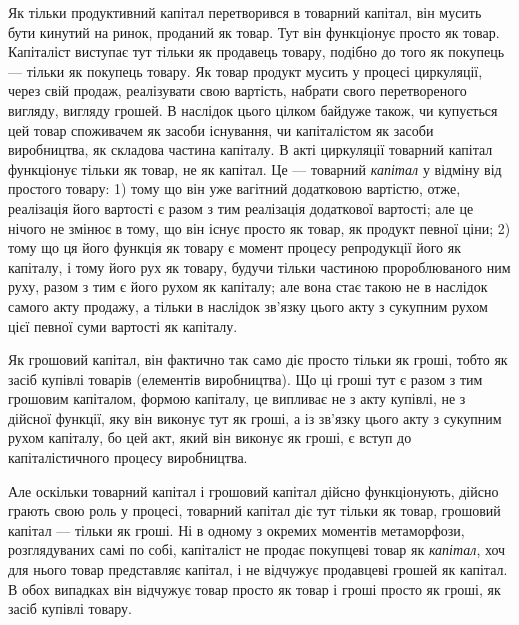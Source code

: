 Як тільки продуктивний капітал перетворився в товарний капітал,
він мусить бути кинутий на ринок, проданий як товар.
Тут він функціонує просто як товар. Капіталіст виступає тут
тільки як продавець товару, подібно до того як покупець —
тільки як покупець товару. Як товар продукт мусить у процесі
циркуляції, через свій продаж, реалізувати свою вартість, набрати
свого перетвореного вигляду, вигляду грошей. В наслідок
цього цілком байдуже також, чи купується цей товар споживачем
як засоби існування, чи капіталістом як засоби виробництва,
як складова частина капіталу. В акті циркуляції товарний
капітал функціонує тільки як товар, не як капітал. Це — товарний \emph{капітал} у відміну від простого
товару: 1) тому що він
уже вагітний додатковою вартістю, отже, реалізація його вартості
є разом з тим реалізація додаткової вартості; але це нічого не
змінює в тому, що він існує просто як товар, як продукт певної
ціни; 2) тому що ця його функція як товару є момент процесу
репродукції його як капіталу, і тому його рух як товару,
будучи тільки частиною пророблюваного ним руху, разом з тим
є його рухом як капіталу; але вона стає такою не в наслідок
самого акту продажу, а тільки в наслідок зв’язку цього акту
з сукупним рухом цієї певної суми вартості як капіталу.

Як грошовий капітал, він фактично так само діє просто тільки
як гроші, тобто як засіб купівлі товарів (елементів виробництва).
Що ці гроші тут є разом з тим грошовим капіталом, формою капіталу,
це випливає не з акту купівлі, не з дійсної функції, яку
він виконує тут як гроші, а із зв’язку цього акту з сукупним
рухом капіталу, бо цей акт, який він виконує як гроші, є вступ
до капіталістичного процесу виробництва.

Але оскільки товарний капітал і грошовий капітал дійсно
функціонують, дійсно грають свою роль у процесі, товарний капітал
діє тут тільки як товар, грошовий капітал — тільки як гроші.
Ні в одному з окремих моментів метаморфози, розглядуваних самі
по собі, капіталіст не продає покупцеві товар як \emph{капітал}, хоч
для нього товар представляє капітал, і не відчужує продавцеві
грошей як капітал. В обох випадках він відчужує товар
просто як товар і гроші просто як гроші, як засіб купівлі
товару.


